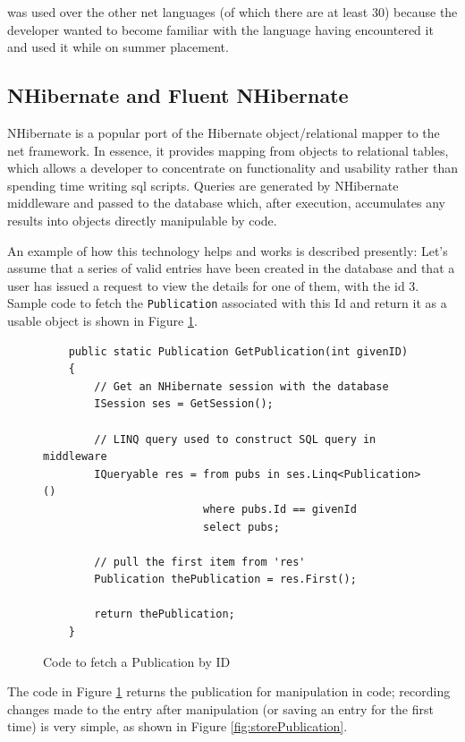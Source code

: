\cs{} was used over the other \gls{net} languages (of which there are at least 30) \cite{csUnleashed} because the developer wanted to become familiar with the language having encountered it and used it while on summer placement.

\subsection{NHibernate and Fluent NHibernate}
\label{nhibernate}
NHibernate is a popular \cite{KHBK09} port of the Hibernate object/relational mapper to the \gls{net} framework.  In essence, it provides mapping from objects to relational tables, which allows a developer to concentrate on functionality and usability rather than spending time writing \gls{sql} scripts. Queries are generated by NHibernate middleware and passed to the database which, after execution, accumulates any results into objects directly manipulable by \cs{} code. 

An example of how this technology helps and works is described presently: Let's assume that a series of valid entries have been created in the database and that a user has issued a request to view the details for one of them, with the \gls{id} 3.  Sample code to fetch the \texttt{Publication} associated with this Id and return it as a usable object is shown in Figure \ref{fig:fetchPubCode}.

\begin{figure}
	\begin{center}
			\lstset{language=CSharp} 
			\begin{lstlisting}
	public static Publication GetPublication(int givenID)
	{
	    // Get an NHibernate session with the database
	    ISession ses = GetSession(); 
	
	   	// LINQ query used to construct SQL query in middleware
	    IQueryable res = from pubs in ses.Linq<Publication>()
	                     where pubs.Id == givenId
	                     select pubs;
	                        
	    // pull the first item from 'res' 
	    Publication thePublication = res.First();
	    
	    return thePublication;
	}
			\end{lstlisting}
		\caption{Code to fetch a Publication by ID}
		\label{fig:fetchPubCode}
	\end{center}
\end{figure}

The code in Figure \ref{fig:fetchPubCode} returns the publication for manipulation in code; recording changes made to the entry after manipulation (or saving an entry for the first time) is very simple, as shown in Figure \ref{fig:storePublication}.

